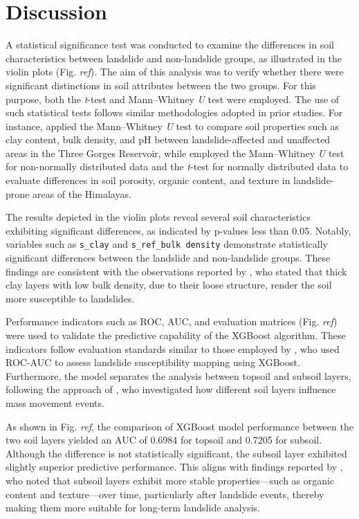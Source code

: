 \section{Discussion}

A statistical significance test was conducted to examine the differences in soil characteristics between landslide and non-landslide groups, as illustrated in the violin plots (Fig. \textit{ref}). The aim of this analysis was to verify whether there were significant distinctions in soil attributes between the two groups. For this purpose, both the \textit{t}-test and Mann–Whitney \textit{U} test were employed. The use of such statistical tests follows similar methodologies adopted in prior studies. For instance, \cite{disc01} applied the Mann–Whitney \textit{U} test to compare soil properties such as clay content, bulk density, and pH between landslide-affected and unaffected areas in the Three Gorges Reservoir, while \cite{disc02} employed the Mann–Whitney \textit{U} test for non-normally distributed data and the \textit{t}-test for normally distributed data to evaluate differences in soil porosity, organic content, and texture in landslide-prone areas of the Himalayas.

The results depicted in the violin plots reveal several soil characteristics exhibiting significant differences, as indicated by p-values less than 0.05. Notably, variables such as \texttt{s\_clay} and \texttt{s\_ref\_bulk density} demonstrate statistically significant differences between the landslide and non-landslide groups. These findings are consistent with the observations reported by \cite{disc03}, who stated that thick clay layers with low bulk density, due to their loose structure, render the soil more susceptible to landslides.

Performance indicators such as ROC, AUC, and evaluation matrices (Fig. \textit{ref}) were used to validate the predictive capability of the XGBoost algorithm. These indicators follow evaluation standards similar to those employed by \cite{disc04}, who used ROC-AUC to assess landslide susceptibility mapping using XGBoost. Furthermore, the model separates the analysis between topsoil and subsoil layers, following the approach of \cite{disc05}, who investigated how different soil layers influence mass movement events.

As shown in Fig. \textit{ref}, the comparison of XGBoost model performance between the two soil layers yielded an AUC of 0.6984 for topsoil and 0.7205 for subsoil. Although the difference is not statistically significant, the subsoil layer exhibited slightly superior predictive performance. This aligns with findings reported by \cite{disc06}, who noted that subsoil layers exhibit more stable properties—such as organic content and texture—over time, particularly after landslide events, thereby making them more suitable for long-term landslide analysis.

